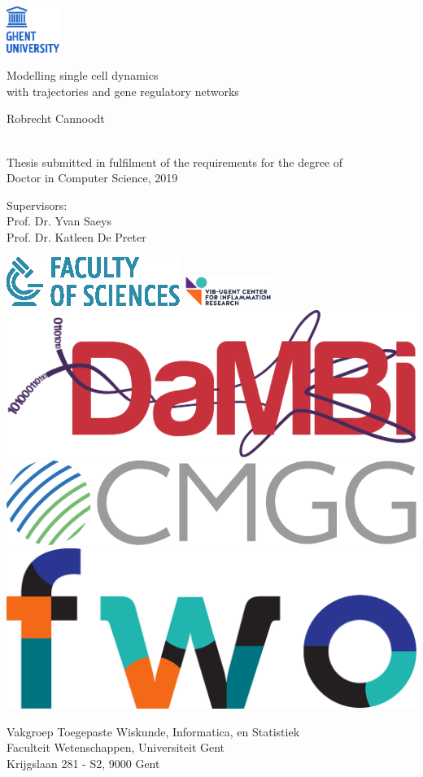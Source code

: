 \begin{titlepage}
	
	\includegraphics[height=1.5cm]{fig/logos/logo_UGent_EN_RGB_color}
	
	\centering
	
	\vfill
	{\Huge \textsf{Modelling single cell dynamics\\with trajectories and gene regulatory networks}}
	
	\vspace{2.25cm}
	
	{\LARGE \textsf{Robrecht Cannoodt}} \\
	 \\
	
	\vspace{2.25cm}
	
	{\textsf{Thesis submitted in fulfilment of the requirements for the degree of \\Doctor in Computer Science, 2019}}
	
	\vfill
	
	{\textsf{Supervisors: \\
			Prof. Dr. Yvan Saeys\\Prof. Dr. Katleen De Preter}}
	
	\vfill
	
	\includegraphics[height=.7cm]{fig/logos/icon_UGent_WE_EN_RGB_color}\hfill
	\includegraphics[height=1cm]{fig/logos/vib_rf_inflammation_research_rgb_pos} \hfill
	\includegraphics[height=.8cm]{fig/logos/dambi_logo} \hfill
	\includegraphics[height=.7cm]{fig/logos/cmgg_myshort} \hfill
	\includegraphics[height=.7cm]{fig/logos/FWO_Logo_KleurCMYK} 
	\vspace{1cm}
	
	{\textsf{Vakgroep Toegepaste Wiskunde, Informatica, en Statistiek\\
			Faculteit Wetenschappen, Universiteit Gent \\
			Krijgslaan 281 - S2, 9000 Gent}}
		
\end{titlepage}

